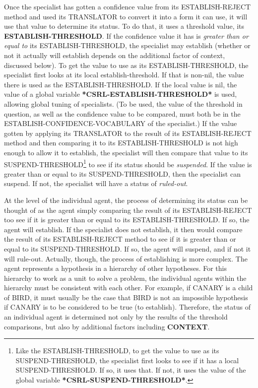 Once the specialist has gotten a confidence value from its
ESTABLISH-REJECT method and used its TRANSLATOR to convert it into a
form it can use, it will use that value to determine its status. To do
that, it uses a threshold value, its {\bf ESTABLISH-THRESHOLD}. If the
confidence value it has is {\it greater than or equal to} its
ESTABLISH-THRESHOLD, the specialist may establish (whether or not it
actually will establish depends on the additional factor of context,
discussed below).  To get the value to use as its ESTABLISH-THRESHOLD,
the specialist first looks at its local establish-threshold. If that
is non-nil, the value there is used as the ESTABLISH-THRESHOLD. If the
local value is nil, the value of a global variable {\bf
*CSRL-ESTABLISH-THRESHOLD*} is used, allowing global tuning of
specialists. (To be used, the value of the threshold in question, as
well as the confidence value to be compared, must both be in the
ESTABLISH-CONFIDENCE-VOCABULARY of the specialist.) If the value
gotten by applying its TRANSLATOR to the result of its
ESTABLISH-REJECT method and then comparing it to its
ESTABLISH-THRESHOLD is not high enough to allow it to establish, the
specialist will then compare that value to its
SUSPEND-THRESHOLD\footnote{Like the ESTABLISH-THRESHOLD, to get the
value to use as its SUSPEND-THRESHOLD, the specialist first looks to
see if it has a local SUSPEND-THRESHOLD. If so, it uses that. If not,
it uses the value of the global variable {\bf
*CSRL-SUSPEND-THRESHOLD*}.} to see if its status should be {\it
suspended\/}. If the value is greater than or equal to its
SUSPEND-THRESHOLD, then the specialist can suspend. If not, the
specialist will have a status of {\it ruled-out\/}.

At the level of the individual agent, the process of determining its
status can be thought of as the agent simply comparing the result of
its ESTABLISH-REJECT too see if it is greater than or equal to its
ESTABLISH-THRESHOLD. If so, the agent will establish. If the
specialist does not establish, it then would compare the result of its
ESTABLISH-REJECT method to see if it is greater than or equal to its
SUSPEND-THRESHOLD. If so, the agent will suspend, and if not it will
rule-out. Actually, though, the process of establishing is more
complex. The agent represents a hypothesis in a hierarchy of other
hypotheses. For this hierarchy to work as a unit to solve a problem,
the individual agents within the hierarchy must be consistent with
each other. For example, if CANARY is a child of BIRD, it must usually
be the case that BIRD is not an impossible hypothesis if CANARY is to
be considered to be true (to establish). Therefore, the status of an
individual agent is determined not only by the results of the
threshold comparisons, but also by additional factors including {\bf
CONTEXT}.


